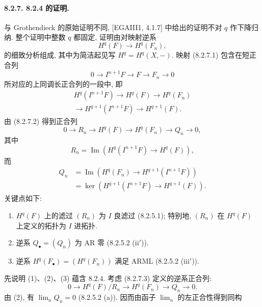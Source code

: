 \paragraph{8.2.7. 8.2.4 的证明.}
与 Grothendieck 的原始证明不同, [EGAIII1, 4.1.7] 中给出的证明不对 $q$ 作下降归纳. 整个证明中整数 $q$ 都固定, 证明由对映射逆系
\begin{equation}H^q(F)\longrightarrow H^q(F_n),\tag{8.2.7.1}\label{ch08:eq8271}\end{equation}
的细致分析组成, 其中为简洁起见写 $H^q=H^q(X,-)$. 映射 (8.2.7.1) 包含在短正合列
\[0\longrightarrow I^{n+1}F\longrightarrow F\longrightarrow F_n\longrightarrow0\]
所对应的上同调长正合列的一段中, 即
\begin{equation}\begin{aligned}
H^q(I^{n+1}F)\longrightarrow H^q(F)\longrightarrow H^q(F_n)\\
\longrightarrow H^{q+1}(I^{n+1}F)\longrightarrow H^{q+1}(F).
\end{aligned}\tag{8.2.7.2}\label{ch08:eq8272}\end{equation}
由 (8.2.7.2) 得到正合列
\begin{equation}0\longrightarrow R_n\longrightarrow H^q(F)\longrightarrow H^q(F_n)\longrightarrow Q_n\longrightarrow0,\tag{8.2.7.3}\label{ch08:eq8273}\end{equation}
其中
\[R_n=\operatorname{Im}(H^q(I^{n+1}F)\longrightarrow H^q(F)),\]
而
\[\begin{aligned}
Q_n&=\operatorname{Im}(H^q(F_n)\longrightarrow H^{q+1}(I^{n+1}F))\\
&=\ker(H^{q+1}(I^{n+1}F)\longrightarrow H^{q+1}(F)).
\end{aligned}\]
关键点如下:
\begin{enumerate}
\item[(1)] $H^q(F)$ 上的滤过 $(R_n)$ 为 $I$ 良滤过 (8.2.5.1); 特别地, $(R_n)$ 在 $H^q(F)$ 上定义的拓扑为 $I$ 进拓扑.
\item[(2)] 逆系 $Q_\bullet=(Q_n)$ 为 AR 零 (8.2.5.2 (ii$'$)).
\item[(3)] 逆系 $H^q(F_\bullet)=(H^q(F_n))$ 满足 ARML (8.2.5.2 (iii$'$)).
\end{enumerate}
先说明 (1)、(2)、(3) 蕴含 8.2.4. 考虑 (8.2.7.3) 定义的逆系正合列:
\begin{equation}0\longrightarrow H^q(F)/R_n\longrightarrow H^q(F_n)\longrightarrow Q_n\longrightarrow0.\tag{*}\label{ch08:eq827star}\end{equation}
由 (2), 有 $\lim_nQ_n=0$ (8.2.5.2 (a)). 因而由函子 $\lim_n$ 的左正合性得到同构
